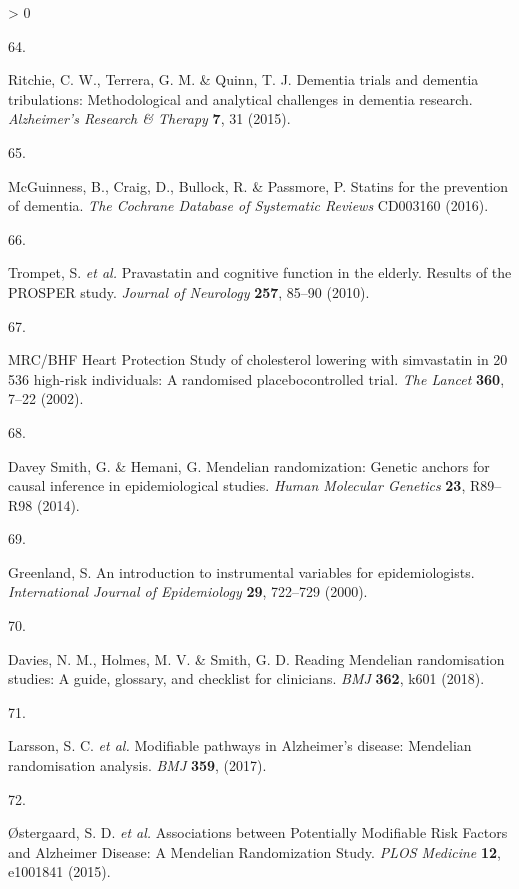 \documentclass[a4paper, twoside]{templates/ociamthesis}
\newlength{\cslhangindent}
\newlength{\csllabelwidth}
\newenvironment{CSLReferences}[3] %
 {%
  \setlength{\parindent}{0pt}
  \ifodd #1 \everypar{\setlength{\hangindent}{\cslhangindent}}\ignorespaces\fi
  \ifnum #2 > 0
  \setlength{\parskip}{#2\baselineskip}
  \fi
 }%
 {}
\newcommand{\CSLLeftMargin}[1]{\parbox[t]{\maxof{\widthof{#1}}{\csllabelwidth}}{#1}}
\newcommand{\CSLRightInline}[1]{\parbox[t]{\linewidth - \csllabelwidth}{#1}}
\begin{document}
\begin{CSLReferences}{0}{0}
\leavevmode\hypertarget{ref-ritchie2015}{}%
\CSLLeftMargin{64. }
\CSLRightInline{Ritchie, C. W., Terrera, G. M. \& Quinn, T. J. Dementia trials and dementia tribulations: Methodological and analytical challenges in dementia research. \emph{Alzheimer's Research \& Therapy} \textbf{7}, 31 (2015).}

\leavevmode\hypertarget{ref-mcguinness2016}{}%
\CSLLeftMargin{65. }
\CSLRightInline{McGuinness, B., Craig, D., Bullock, R. \& Passmore, P. Statins for the prevention of dementia. \emph{The Cochrane Database of Systematic Reviews} CD003160 (2016).}

\leavevmode\hypertarget{ref-trompet2010}{}%
\CSLLeftMargin{66. }
\CSLRightInline{Trompet, S. \emph{et al.} Pravastatin and cognitive function in the elderly. {Results} of the {PROSPER} study. \emph{Journal of Neurology} \textbf{257}, 85--90 (2010).}

\leavevmode\hypertarget{ref-heartprotectionstudycollaborativegroup2002}{}%
\CSLLeftMargin{67. }
\CSLRightInline{{MRC}/{BHF Heart Protection Study} of cholesterol lowering with simvastatin in 20 536 high-risk individuals: A randomised placebocontrolled trial. \emph{The Lancet} \textbf{360}, 7--22 (2002).}

\leavevmode\hypertarget{ref-daveysmith2014}{}%
\CSLLeftMargin{68. }
\CSLRightInline{Davey Smith, G. \& Hemani, G. Mendelian randomization: Genetic anchors for causal inference in epidemiological studies. \emph{Human Molecular Genetics} \textbf{23}, R89--R98 (2014).}

\leavevmode\hypertarget{ref-greenland2000}{}%
\CSLLeftMargin{69. }
\CSLRightInline{Greenland, S. An introduction to instrumental variables for epidemiologists. \emph{International Journal of Epidemiology} \textbf{29}, 722--729 (2000).}

\leavevmode\hypertarget{ref-davies2018}{}%
\CSLLeftMargin{70. }
\CSLRightInline{Davies, N. M., Holmes, M. V. \& Smith, G. D. Reading {Mendelian} randomisation studies: A guide, glossary, and checklist for clinicians. \emph{BMJ} \textbf{362}, k601 (2018).}

\leavevmode\hypertarget{ref-larsson2017}{}%
\CSLLeftMargin{71. }
\CSLRightInline{Larsson, S. C. \emph{et al.} Modifiable pathways in {Alzheimer}'s disease: Mendelian randomisation analysis. \emph{BMJ} \textbf{359}, (2017).}

\leavevmode\hypertarget{ref-ostergaard2015}{}%
\CSLLeftMargin{72. }
\CSLRightInline{Østergaard, S. D. \emph{et al.} Associations between {Potentially Modifiable Risk Factors} and {Alzheimer Disease}: A {Mendelian Randomization Study}. \emph{PLOS Medicine} \textbf{12}, e1001841 (2015).}


\end{CSLReferences}
\end{document}
